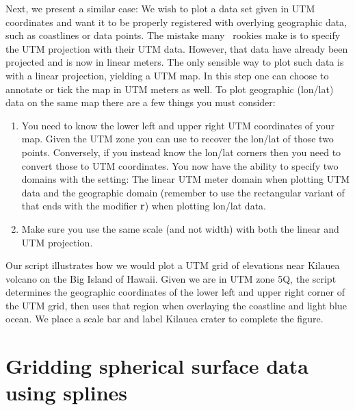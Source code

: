 Next, we present a similar case: We wish to plot a data set given in UTM coordinates and want it
to be properly registered with overlying geographic data, such as coastlines or data points.  The
mistake many \GMT\ rookies make is to specify the UTM projection with their UTM
data.  However, that data have already been projected and is now in linear meters.  The only
sensible way to plot such data is with a linear projection, yielding a UTM map.  In this step one can
choose to annotate or tick the map in UTM meters as well.  To plot geographic (lon/lat) data on
the same map there are a few things you must consider:
\begin{enumerate}
	\item You need to know the lower left and upper right UTM coordinates of your map. Given
	the UTM zone you can use  to recover the lon/lat of those two points.
	Conversely, if you instead know the lon/lat corners then you need to convert those
	to UTM coordinates.  You now have the ability to specify two domains with the  setting:
	The linear UTM meter domain when plotting UTM data and the geographic domain (remember to use the
	rectangular variant of  that ends with the modifier {\bf r}) when plotting lon/lat data.
	\item Make sure you use the same scale (and not width) with both the linear and UTM projection.
\end{enumerate}


Our script illustrates how we would plot a UTM grid of elevations near Kilauea volcano on the Big Island
of Hawaii.  Given we are in UTM zone 5Q, the script determines the geographic coordinates of the
lower left and upper right corner of the UTM grid, then uses that region when overlaying the coastline
and light blue ocean.  We place a scale bar and label Kilauea crater to complete the figure.

 

\section{Gridding spherical surface data using splines}

